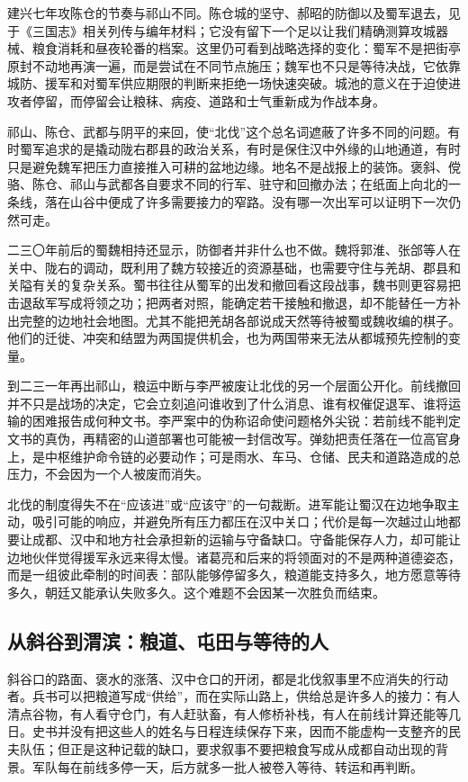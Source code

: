 建兴七年攻陈仓的节奏与祁山不同。陈仓城的坚守、郝昭的防御以及蜀军退去，见于《三国志》相关列传与编年材料；它没有留下一个足以让我们精确测算攻城器械、粮食消耗和昼夜轮番的档案。这里仍可看到战略选择的变化：蜀军不是把街亭原封不动地再演一遍，而是尝试在不同节点施压；魏军也不只是等待决战，它依靠城防、援军和对蜀军供应期限的判断来拒绝一场快速突破。城池的意义在于迫使进攻者停留，而停留会让粮秣、病疫、道路和士气重新成为作战本身。

祁山、陈仓、武都与阴平的来回，使“北伐”这个总名词遮蔽了许多不同的问题。有时蜀军追求的是撬动陇右郡县的政治关系，有时是保住汉中外缘的山地通道，有时只是避免魏军把压力直接推入可耕的盆地边缘。地名不是战报上的装饰。褒斜、傥骆、陈仓、祁山与武都各自要求不同的行军、驻守和回撤办法；在纸面上向北的一条线，落在山谷中便成了许多需要接力的窄路。没有哪一次出军可以证明下一次仍然可走。

二三〇年前后的蜀魏相持还显示，防御者并非什么也不做。魏将郭淮、张郃等人在关中、陇右的调动，既利用了魏方较接近的资源基础，也需要守住与羌胡、郡县和关隘有关的复杂关系。蜀书往往从蜀军的出发和撤回看这段战事，魏书则更容易把击退敌军写成将领之功；把两者对照，能确定若干接触和撤退，却不能替任一方补出完整的边地社会地图。尤其不能把羌胡各部说成天然等待被蜀或魏收编的棋子。他们的迁徙、冲突和结盟为两国提供机会，也为两国带来无法从都城预先控制的变量。

到二三一年再出祁山，粮运中断与李严被废让北伐的另一个层面公开化。前线撤回并不只是战场的决定，它会立刻追问谁收到了什么消息、谁有权催促退军、谁将运输的困难报告成何种文书。李严案中的伪称诏命使问题格外尖锐：若前线不能判定文书的真伪，再精密的山道部署也可能被一封信改写。弹劾把责任落在一位高官身上，是中枢维护命令链的必要动作；可是雨水、车马、仓储、民夫和道路造成的总压力，不会因为一个人被废而消失。

北伐的制度得失不在“应该进”或“应该守”的一句裁断。进军能让蜀汉在边地争取主动，吸引可能的响应，并避免所有压力都压在汉中关口；代价是每一次越过山地都要让成都、汉中和地方社会承担新的运输与守备缺口。守备能保存人力，却可能让边地伙伴觉得援军永远来得太慢。诸葛亮和后来的将领面对的不是两种道德姿态，而是一组彼此牵制的时间表：部队能够停留多久，粮道能支持多久，地方愿意等待多久，朝廷又能承认失败多久。这个难题不会因某一次胜负而结束。

\subsection{从斜谷到渭滨：粮道、屯田与等待的人}

斜谷口的路面、褒水的涨落、汉中仓口的开闭，都是北伐叙事里不应消失的行动者。兵书可以把粮道写成“供给”，而在实际山路上，供给总是许多人的接力：有人清点谷物，有人看守仓门，有人赶驮畜，有人修桥补栈，有人在前线计算还能等几日。史书并没有把这些人的姓名与日程连续保存下来，因而不能虚构一支整齐的民夫队伍；但正是这种记载的缺口，要求叙事不要把粮食写成从成都自动出现的背景。军队每在前线多停一天，后方就多一批人被卷入等待、转运和再判断。

